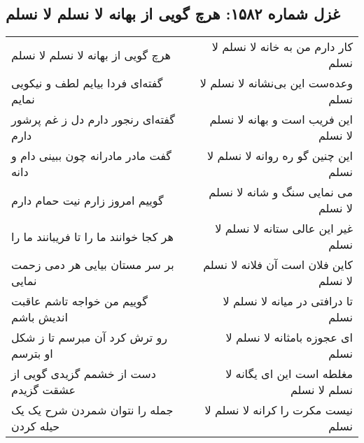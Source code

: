 \begin{center}
\section*{غزل شماره ۱۵۸۲: هرچ گویی از بهانه لا نسلم لا نسلم}
\label{sec:1582}
\begin{longtable}{l p{0.5cm} r}
هرچ گویی از بهانه لا نسلم لا نسلم
&&
کار دارم من به خانه لا نسلم لا نسلم
\\
گفته‌ای فردا بیایم لطف و نیکویی نمایم
&&
وعده‌ست این بی‌نشانه لا نسلم لا نسلم
\\
گفته‌ای رنجور دارم دل ز غم پرشور دارم
&&
این فریب است و بهانه لا نسلم لا نسلم
\\
گفت مادر مادرانه چون ببینی دام و دانه
&&
این چنین گو ره روانه لا نسلم لا نسلم
\\
گوییم امروز زارم نیت حمام دارم
&&
می نمایی سنگ و شانه لا نسلم لا نسلم
\\
هر کجا خوانند ما را تا فریبانند ما را
&&
غیر این عالی ستانه لا نسلم لا نسلم
\\
بر سر مستان بیایی هر دمی زحمت نمایی
&&
کاین فلان است آن فلانه لا نسلم لا نسلم
\\
گوییم من خواجه تاشم عاقبت اندیش باشم
&&
تا درافتی در میانه لا نسلم لا نسلم
\\
رو ترش کرد آن مبرسم تا ز شکل او بترسم
&&
ای عجوزه بامثانه لا نسلم لا نسلم
\\
دست از خشمم گزیدی گویی از عشقت گزیدم
&&
مغلطه است این ای یگانه لا نسلم لا نسلم
\\
جمله را نتوان شمردن شرح یک یک حیله کردن
&&
نیست مکرت را کرانه لا نسلم لا نسلم
\\
\end{longtable}
\end{center}

